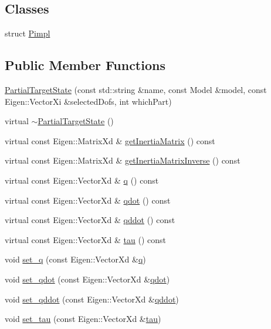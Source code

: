 \subsection*{Classes}
\begin{DoxyCompactItemize}
\item 
struct \hyperlink{structocra_1_1PartialTargetState_1_1Pimpl}{Pimpl}
\end{DoxyCompactItemize}
\subsection*{Public Member Functions}
\begin{DoxyCompactItemize}
\item 
\hyperlink{classocra_1_1PartialTargetState_a2aed8d7e02fa12907eb218449afc6422}{Partial\+Target\+State} (const std\+::string \&name, const Model \&model, const Eigen\+::\+Vector\+Xi \&selected\+Dofs, int which\+Part)
\item 
virtual \hyperlink{classocra_1_1PartialTargetState_a32d63501a917b40728387258cb1e06d1}{$\sim$\+Partial\+Target\+State} ()
\item 
virtual const Eigen\+::\+Matrix\+Xd \& \hyperlink{classocra_1_1PartialTargetState_a757cd49fca47e934025e92b81dc15535}{get\+Inertia\+Matrix} () const
\item 
virtual const Eigen\+::\+Matrix\+Xd \& \hyperlink{classocra_1_1PartialTargetState_a0e6f90f112e0a54384eb99dd7def49e0}{get\+Inertia\+Matrix\+Inverse} () const
\item 
virtual const Eigen\+::\+Vector\+Xd \& \hyperlink{classocra_1_1PartialTargetState_af953d48bac74ff93ed79d4c75bde207f}{q} () const
\item 
virtual const Eigen\+::\+Vector\+Xd \& \hyperlink{classocra_1_1PartialTargetState_a9442a4f1c0827a20b6d6582dcceff88a}{qdot} () const
\item 
virtual const Eigen\+::\+Vector\+Xd \& \hyperlink{classocra_1_1PartialTargetState_a450c270ee9583ad7cde6a91630045792}{qddot} () const
\item 
virtual const Eigen\+::\+Vector\+Xd \& \hyperlink{classocra_1_1PartialTargetState_ac76855da54cf77b63bdbd7ecdb6ef57d}{tau} () const
\item 
void \hyperlink{classocra_1_1PartialTargetState_aa1cf1348c8e9880897df5f7f925dcac5}{set\+\_\+q} (const Eigen\+::\+Vector\+Xd \&\hyperlink{classocra_1_1PartialTargetState_af953d48bac74ff93ed79d4c75bde207f}{q})
\item 
void \hyperlink{classocra_1_1PartialTargetState_af04d90592c43ee69ed14e212e7fa2f47}{set\+\_\+qdot} (const Eigen\+::\+Vector\+Xd \&\hyperlink{classocra_1_1PartialTargetState_a9442a4f1c0827a20b6d6582dcceff88a}{qdot})
\item 
void \hyperlink{classocra_1_1PartialTargetState_a4acfcf9b591e296d56c91e00bdbd2a69}{set\+\_\+qddot} (const Eigen\+::\+Vector\+Xd \&\hyperlink{classocra_1_1PartialTargetState_a450c270ee9583ad7cde6a91630045792}{qddot})
\item 
void \hyperlink{classocra_1_1PartialTargetState_a3c58ea195fb95e9a5a5e7a00939f955d}{set\+\_\+tau} (const Eigen\+::\+Vector\+Xd \&\hyperlink{classocra_1_1PartialTargetState_ac76855da54cf77b63bdbd7ecdb6ef57d}{tau})
\end{DoxyCompactItemize}
